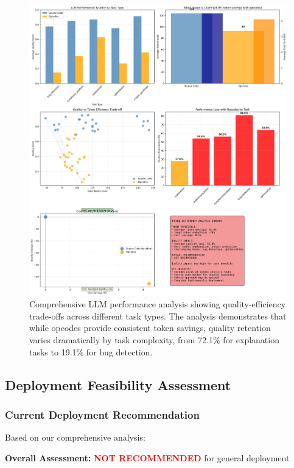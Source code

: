\documentclass[11pt,a4paper]{article}
\begin{document}
\begin{figure}[H]
\centering
\includegraphics[width=\textwidth]{llm_performance_analysis.png}
\caption{Comprehensive LLM performance analysis showing quality-efficiency trade-offs across different task types. The analysis demonstrates that while opcodes provide consistent token savings, quality retention varies dramatically by task complexity, from 72.1\% for explanation tasks to 19.1\% for bug detection.}
\label{fig:llm_performance}
\end{figure}

\subsection{Deployment Feasibility Assessment}

\subsubsection{Current Deployment Recommendation}
Based on our comprehensive analysis:

\textbf{Overall Assessment:} \textcolor{red}{\textbf{NOT RECOMMENDED}} for general deployment
\end{document}
